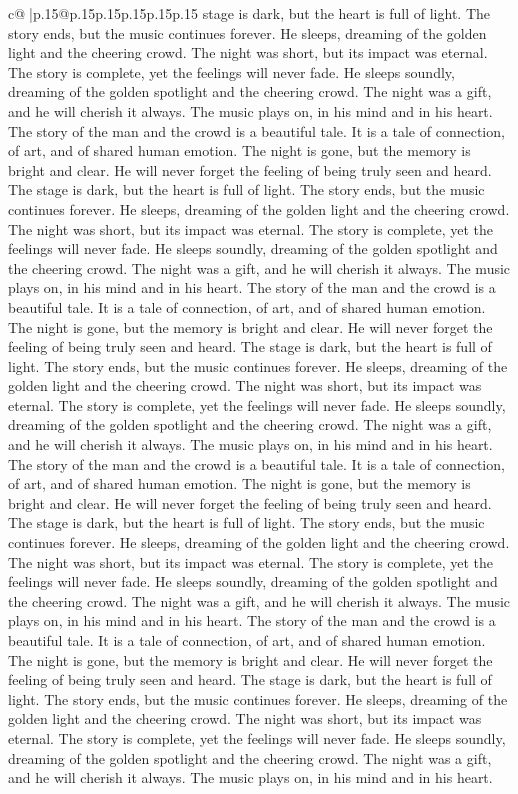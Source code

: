 \documentclass{article}
\begin{document}
{\begin{supertabular}{c@{$\;$}|p{.15\linewidth}@{}p{.15\linewidth}p{.15\linewidth}p{.15\linewidth}p{.15\linewidth}p{.15\linewidth}}
{{{stage is dark, but the heart is full of light. The story ends, but the music continues forever. He sleeps, dreaming of the golden light and the cheering crowd. The night was short, but its impact was eternal. The story is complete, yet the feelings will never fade. He sleeps soundly, dreaming of the golden spotlight and the cheering crowd. The night was a gift, and he will cherish it always. The music plays on, in his mind and in his heart. The story of the man and the crowd is a beautiful tale. It is a tale of connection, of art, and of shared human emotion. The night is gone, but the memory is bright and clear. He will never forget the feeling of being truly seen and heard. The stage is dark, but the heart is full of light. The story ends, but the music continues forever. He sleeps, dreaming of the golden light and the cheering crowd. The night was short, but its impact was eternal. The story is complete, yet the feelings will never fade. He sleeps soundly, dreaming of the golden spotlight and the cheering crowd. The night was a gift, and he will cherish it always. The music plays on, in his mind and in his heart. The story of the man and the crowd is a beautiful tale. It is a tale of connection, of art, and of shared human emotion. The night is gone, but the memory is bright and clear. He will never forget the feeling of being truly seen and heard. The stage is dark, but the heart is full of light. The story ends, but the music continues forever. He sleeps, dreaming of the golden light and the cheering crowd. The night was short, but its impact was eternal. The story is complete, yet the feelings will never fade. He sleeps soundly, dreaming of the golden spotlight and the cheering crowd. The night was a gift, and he will cherish it always. The music plays on, in his mind and in his heart. The story of the man and the crowd is a beautiful tale. It is a tale of connection, of art, and of shared human emotion. The night is gone, but the memory is bright and clear. He will never forget the feeling of being truly seen and heard. The stage is dark, but the heart is full of light. The story ends, but the music continues forever. He sleeps, dreaming of the golden light and the cheering crowd. The night was short, but its impact was eternal. The story is complete, yet the feelings will never fade. He sleeps soundly, dreaming of the golden spotlight and the cheering crowd. The night was a gift, and he will cherish it always. The music plays on, in his mind and in his heart. The story of the man and the crowd is a beautiful tale. It is a tale of connection, of art, and of shared human emotion. The night is gone, but the memory is bright and clear. He will never forget the feeling of being truly seen and heard. The stage is dark, but the heart is full of light. The story ends, but the music continues forever. He sleeps, dreaming of the golden light and the cheering crowd. The night was short, but its impact was eternal. The story is complete, yet the feelings will never fade. He sleeps soundly, dreaming of the golden spotlight and the cheering crowd. The night was a gift, and he will cherish it always. The music plays on, in his mind and in his heart. }}}
\end{supertabular}}
\end{document}

